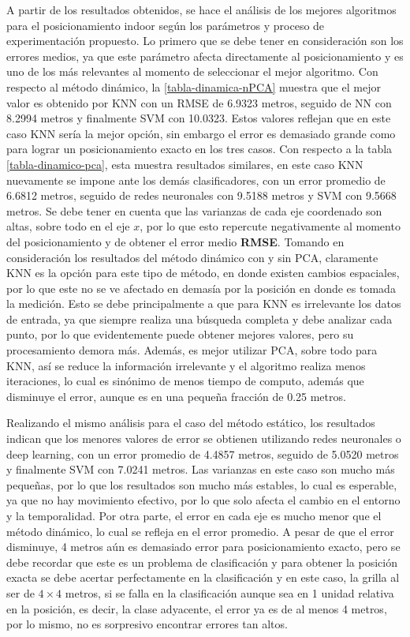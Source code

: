 A partir de los resultados obtenidos, se hace el análisis de los mejores algoritmos para el posicionamiento indoor según los parámetros y proceso de experimentación propuesto. Lo primero que se debe tener en consideración son los errores medios, ya que este parámetro afecta directamente al posicionamiento y es uno de los más relevantes al momento de seleccionar el mejor algoritmo. Con respecto al método dinámico, la \autoref{tabla-dinamica-nPCA} muestra que el mejor valor es obtenido por KNN con un RMSE de 6.9323 metros, seguido de NN con 8.2994 metros y finalmente SVM con 10.0323. Estos valores reflejan que en este caso KNN sería la mejor opción, sin embargo el error es demasiado grande como para lograr un posicionamiento exacto en los tres casos. Con respecto a la tabla \ref{tabla-dinamico-pca}, esta muestra resultados similares, en este caso KNN nuevamente se impone ante los demás clasificadores, con un error promedio de 6.6812 metros, seguido de redes neuronales con 9.5188 metros y SVM con 9.5668 metros. Se debe tener en cuenta que las varianzas de cada eje coordenado son altas, sobre todo en el eje $x$, por lo que esto repercute negativamente al momento del posicionamiento y de obtener el error medio \textbf{RMSE}. Tomando en consideración los resultados del método dinámico con y sin PCA, claramente KNN es la opción para este tipo de método, en donde existen cambios espaciales, por lo que este no se ve afectado en demasía por la posición en donde es tomada la medición. Esto se debe principalmente a que para KNN es irrelevante los datos de entrada, ya que siempre realiza una búsqueda completa y debe analizar cada punto, por lo que evidentemente puede obtener mejores valores, pero su procesamiento demora más. Además, es mejor utilizar PCA, sobre todo para KNN, así se reduce la información irrelevante y el algoritmo realiza menos iteraciones, lo cual es sinónimo de menos tiempo de computo, además que disminuye el error, aunque es en una pequeña fracción de 0.25 metros.

Realizando el mismo análisis para el caso del método estático, los resultados indican que los menores valores de error se obtienen utilizando redes neuronales o deep learning, con un error promedio de 4.4857 metros, seguido de 5.0520 metros y finalmente SVM con 7.0241 metros. Las varianzas en este caso son mucho más pequeñas, por lo que los resultados son mucho más estables, lo cual es esperable, ya que no hay movimiento efectivo, por lo que solo afecta el cambio en el entorno y la temporalidad. Por otra parte, el error en cada eje es mucho menor que el método dinámico, lo cual se refleja en el error promedio. A pesar de que el error disminuye, 4 metros aún es demasiado error para posicionamiento exacto, pero se debe recordar que este es un problema de clasificación y para obtener la posición exacta se debe acertar perfectamente en la clasificación y en este caso, la grilla al ser de $4 \times 4$ metros, si se falla en la clasificación aunque sea en 1 unidad relativa en la posición, es decir, la clase adyacente, el error ya es de al menos 4 metros, por lo mismo, no es sorpresivo encontrar errores tan altos. 

